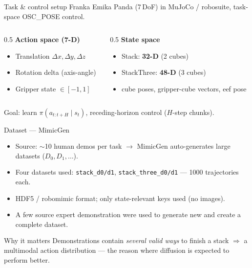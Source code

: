 \documentclass[aspectratio=169,11pt]{beamer}
\begin{document}
\begin{frame}{Task \& control setup}
  Franka Emika Panda (7\,DoF) in MuJoCo / robosuite, task-space OSC\_POSE control.
  \begin{columns}[T]
    \begin{column}{0.5\textwidth}
      \textbf{Action space (7-D)}
      \begin{itemize}
        \item Translation $\Delta x,\Delta y,\Delta z$
        \item Rotation delta (axis-angle)
        \item Gripper state $\in[-1,1]$
      \end{itemize}
    \end{column}
    \begin{column}{0.5\textwidth}
      \textbf{State space}
      \begin{itemize}
        \item Stack: \textbf{32-D} (2 cubes)
        \item StackThree: \textbf{48-D} (3 cubes)
        \item cube poses, gripper-cube vectors, eef pose
      \end{itemize}
    \end{column}
  \end{columns}
  \vfill
  Goal: learn $\pi(a_{t:t+H}\mid s_t)$, receding-horizon control ($H$-step chunks).
\end{frame}

\begin{frame}{Dataset — MimicGen}
  \begin{itemize}
    \item Source: $\sim$10 human demos per task $\to$ MimicGen auto-generates large datasets ($D_0,D_1,\dots$).
    \item Four datasets used: \texttt{stack\_d0/d1}, \texttt{stack\_three\_d0/d1} — 1000 trajectories each.
    \item HDF5 / robomimic format; only state-relevant keys used (no images).
    \item A few source expert demonstration were used to generate new and create a complete dataset.
  \end{itemize}
  \begin{block}{Why it matters}
    Demonstrations contain \emph{several valid ways} to finish a stack $\Rightarrow$ a multimodal
    action distribution — the reason where diffusion is expected to perform better.
  \end{block}
\end{frame}
\end{document}

